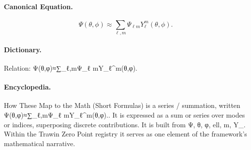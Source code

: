 \paragraph{Canonical Equation.}
\[
\Psi(\theta,\phi)\approx\sum_{\ell,m}\Psi_{\ell m}Y_{\ell}^{m}(\theta,\phi).
\]

\paragraph{Dictionary.}
Relation: Ψ(θ,φ)≈∑\_ℓ,mΨ\_ℓ mY\_ℓ\textasciicircum{}m(θ,φ).

\paragraph{Encyclopedia.}
How These Map to the Math (Short Formulas) is a series / summation, written Ψ(θ,φ)≈∑\_ℓ,mΨ\_ℓ mY\_ℓ\textasciicircum{}m(θ,φ).. It is expressed as a sum or series over modes or indices, superposing discrete contributions. It is built from Ψ, θ, φ, ell, m, Y\_. Within the Trawin Zero Point registry it serves as one element of the framework's mathematical narrative.
